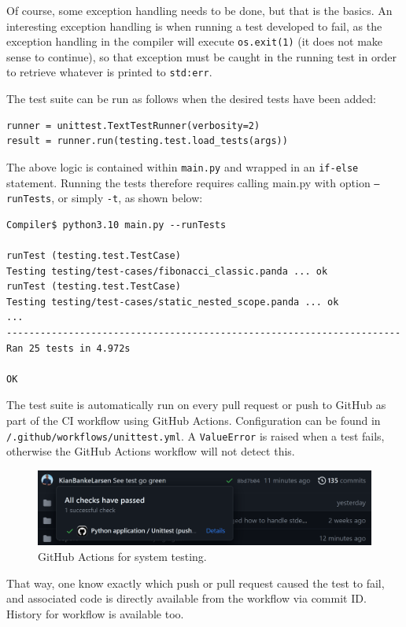 Of course, some exception handling needs to be done, but that is the basics. An interesting exception handling is when running a test developed to fail, as the exception handling in the compiler will execute \texttt{os.exit(1)} (it does not make sense to continue), so that exception must be caught in the running test in order to retrieve whatever is printed to \texttt{std:err}.

The test suite can be run as follows when the desired tests have been added:

\begin{verbatim}
runner = unittest.TextTestRunner(verbosity=2)
result = runner.run(testing.test.load_tests(args))
\end{verbatim}

The above logic is contained within \texttt{main.py} and wrapped in an \texttt{if-else} statement. Running the tests therefore requires calling main.py with option \texttt{--runTests}, or simply \texttt{-t}, as shown below:

\begin{verbatim}
Compiler$ python3.10 main.py --runTests

runTest (testing.test.TestCase)
Testing testing/test-cases/fibonacci_classic.panda ... ok
runTest (testing.test.TestCase)
Testing testing/test-cases/static_nested_scope.panda ... ok
...
----------------------------------------------------------------------
Ran 25 tests in 4.972s

OK 
\end{verbatim}

The test suite is automatically run on every pull request or push to GitHub as part of the CI workflow using GitHub Actions. Configuration can be found in \texttt{/.github/workflows/unittest.yml}. A \texttt{ValueError} is raised when a test fails, otherwise the GitHub Actions workflow will not detect this.

\begin{figure}[H]
    \centering
    \includegraphics[width=1\textwidth]{misc/images/GitHub_Actions.png}
    \caption{GitHub Actions for system testing.}
\end{figure}

That way, one know exactly which push or pull request caused the test to fail, and associated code is directly available from the workflow via commit ID. History for workflow is available too.

